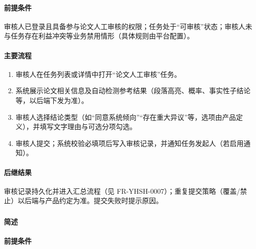 
\paragraph*{前提条件}

审核人已登录且具备参与论文人工审核的权限；任务处于“可审核”状态；审核人未与任务存在利益冲突等业务禁用情形（具体规则由平台配置）。

\paragraph*{主要流程}

\begin{enumerate}
    \item 审核人在任务列表或详情中打开“论文人工审核”任务。
    \item 系统展示论文相关信息及自动检测参考结果（段落高亮、概率、事实性子结论等，以后端下发为准）。
    \item 审核人选择结论类型（如“同意系统倾向”“存在重大异议”等，选项由产品定义），并填写文字理由与可选分项勾选。
    \item 审核人提交；系统校验必填项后写入审核记录，并通知任务发起人（若启用通知）。
\end{enumerate}

\paragraph*{后继结果}

审核记录持久化并进入汇总流程（见 FR-YHSH-0007）；重复提交策略（覆盖/禁止）以后端与产品约定为准。提交失败时提示原因。

\subsubsection{}

\paragraph*{简述}


\paragraph*{前提条件}

